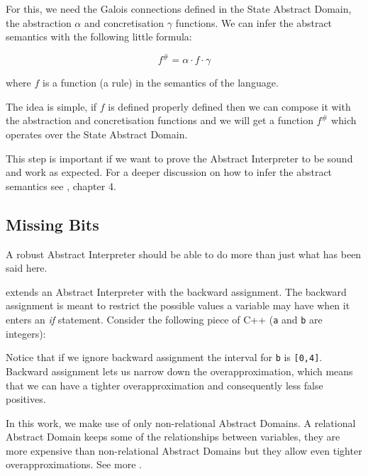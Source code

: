 For this, we need the Galois connections defined in the State Abstract
Domain, the abstraction \(\alpha\) and concretisation \(\gamma\)
functions. We can infer the abstract semantics with the following little
formula:

\[f^\# = \alpha \cdot f \cdot \gamma\]

where \(f\) is a function (a rule) in the semantics of the language.

The idea is simple, if \(f\) is defined properly defined then we can
compose it with the abstraction and concretisation functions and we will
get a function \(f^\#\) which operates over the State Abstract Domain.

This step is important if we want to prove the Abstract Interpreter to
be sound and work as expected. For a deeper discussion on how to infer
the abstract semantics see \textcite{nielson2015principles}, chapter 4.

\subsection{Missing Bits}\label{missing-bits}

A robust Abstract Interpreter should be able to do more than just what
has been said here.

\textcite{mine_weakly_2004} extends an Abstract Interpreter with the
backward assignment. The backward assignment is meant to restrict the
possible values a variable may have when it enters an \emph{if}
statement. Consider the following piece of C++ (\texttt{a} and
\texttt{b} are integers):

\begin{Shaded}
\begin{Highlighting}[]
\NormalTok{) \{}
\NormalTok{\} }\NormalTok{ \{}
\NormalTok{;}
\NormalTok{\}}
\end{Highlighting}
\end{Shaded}

Notice that if we ignore backward assignment the interval for \texttt{b}
is \texttt{{[}0,4{]}}. Backward assignment lets us narrow down the
overapproximation, which means that we can have a tighter
overapproximation and consequently less false positives.

In this work, we make use of only non-relational Abstract Domains. A
relational Abstract Domain keeps some of the relationships between
variables, they are more expensive than non-relational Abstract Domains
but they allow even tighter overapproximations. See more
\textcite{mine_weakly_2004}.
